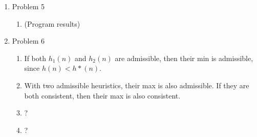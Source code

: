 \documentclass[11pt]{article}
\begin{document}
\begin{enumerate}
\item Problem 5
\begin{enumerate}
\item (Program results)
\end{enumerate}

\item Problem 6
\begin{enumerate}
\item If both $h_{1}(n)$ and $h_2(n)$ are admissible, then their min is admissible, since $h(n) < h*(n)$.
\item With two admissible heuristics, their max is also admissible. If they are both consistent, then their max is also consistent.
\item ?
\item ?
\end{enumerate}


\end{enumerate}
\end{document}
